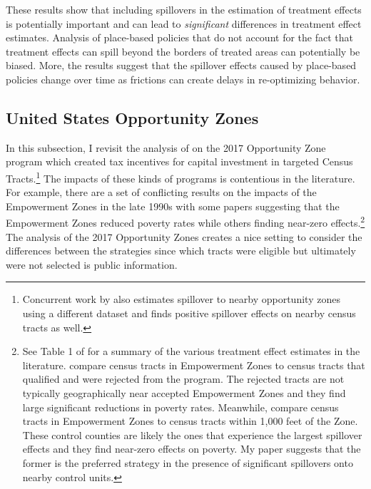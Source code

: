 These results show that including spillovers in the estimation of treatment effects is potentially important and can lead to \textit{significant} differences in treatment effect estimates. Analysis of place-based policies that do not account for the fact that treatment effects can spill beyond the borders of treated areas can potentially be biased. More, the results suggest that the spillover effects caused by place-based policies change over time as frictions can create delays in re-optimizing behavior. 


\subsection{United States Opportunity Zones}\label{sec:oz}

In this subsection, I revisit the analysis of \citet{chen2023jue} on the 2017 Opportunity Zone program which created tax incentives for capital investment in targeted Census Tracts.\footnote{Concurrent work by \citet{Arefeva_2021} also estimates spillover to nearby opportunity zones using a different dataset and finds positive spillover effects on nearby census tracts as well.} The impacts of these kinds of programs is contentious in the literature. For example, there are a set of conflicting results on the impacts of the Empowerment Zones in the late 1990s with some papers suggesting that the Empowerment Zones reduced poverty rates while others finding near-zero effects.\footnote{See Table 1 of \citet{Neumark_Young_2019} for a summary of the various treatment effect estimates in the literature. \citet{Busso_Gregory_Kline_2013} compare census tracts in Empowerment Zones to census tracts that qualified and were rejected from the program. The rejected tracts are not typically geographically near accepted Empowerment Zones and they find large significant reductions in poverty rates. Meanwhile, \citet{Neumark_Kolko_2010} compare census tracts in Empowerment Zones to census tracts within 1,000 feet of the Zone. These control counties are likely the ones that experience the largest spillover effects and they find near-zero effects on poverty. My paper suggests that the former is the preferred strategy in the presence of significant spillovers onto nearby control units.} The analysis of the 2017 Opportunity Zones creates a nice setting to consider the differences between the strategies since which tracts were eligible but ultimately were not selected is public information.

